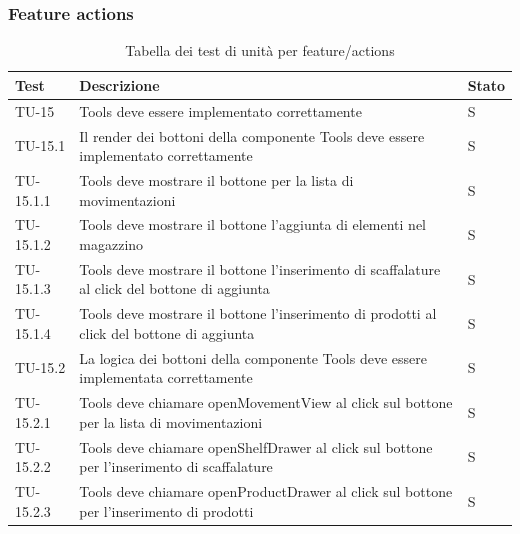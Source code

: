 \subsubsection{Feature actions}
\renewcommand{\arraystretch}{1.5}
\begin{xltabular}{0.9\textwidth}{X | p{0.6\textwidth} | p{0.1\textwidth} }
    \textbf{\color{white} Test} & \textbf{\color{white} Descrizione} & \textbf{\color{white} Stato}\\ 
    \hline
    \endhead
    \caption{Tabella dei test di unità per feature/actions} 
    \label{tab:test_sistema}
    \endlastfoot

    TU-15 & Tools deve essere implementato correttamente & S\\
    TU-15.1 & Il render dei bottoni della componente Tools deve essere implementato correttamente & S\\
    TU-15.1.1 & Tools deve mostrare il bottone per la lista di movimentazioni & S\\
    TU-15.1.2 & Tools deve mostrare il bottone l'aggiunta di elementi nel magazzino & S\\
    TU-15.1.3 & Tools deve mostrare il bottone l'inserimento di scaffalature al click del bottone di aggiunta & S\\
    TU-15.1.4 & Tools deve mostrare il bottone l'inserimento di prodotti al click del bottone di aggiunta & S\\
    TU-15.2 & La logica dei bottoni della componente Tools deve essere implementata correttamente & S\\
    TU-15.2.1 & Tools deve chiamare openMovementView al click sul bottone per la lista di movimentazioni & S\\
    TU-15.2.2 & Tools deve chiamare openShelfDrawer al click sul bottone per l'inserimento di scaffalature & S\\
    TU-15.2.3 & Tools deve chiamare openProductDrawer al click sul bottone per l'inserimento di prodotti & S\\


\end{xltabular}
